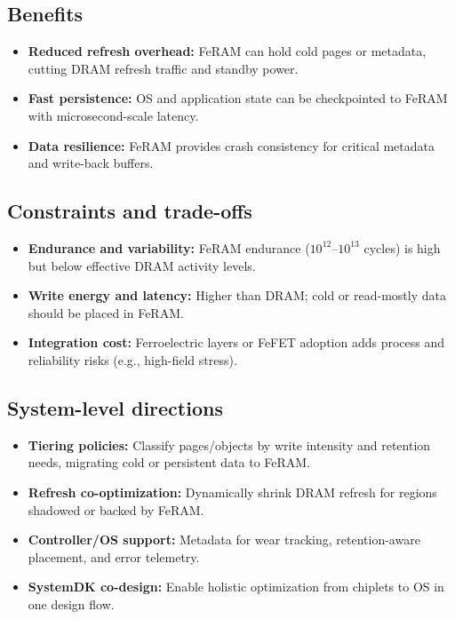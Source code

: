\subsection*{Benefits}
\begin{itemize}
  \item \textbf{Reduced refresh overhead:} FeRAM can hold cold pages or metadata, cutting DRAM refresh traffic and standby power.
  \item \textbf{Fast persistence:} OS and application state can be checkpointed to FeRAM with microsecond-scale latency.
  \item \textbf{Data resilience:} FeRAM provides crash consistency for critical metadata and write-back buffers.
\end{itemize}

\subsection*{Constraints and trade-offs}
\begin{itemize}
  \item \textbf{Endurance and variability:} FeRAM endurance ($10^{12}$--$10^{13}$ cycles) is high but below effective DRAM activity levels.
  \item \textbf{Write energy and latency:} Higher than DRAM; cold or read-mostly data should be placed in FeRAM.
  \item \textbf{Integration cost:} Ferroelectric layers or FeFET adoption adds process and reliability risks (e.g., high-field stress).
\end{itemize}

\subsection*{System-level directions}
\begin{itemize}
  \item \textbf{Tiering policies:} Classify pages/objects by write intensity and retention needs, migrating cold or persistent data to FeRAM.
  \item \textbf{Refresh co-optimization:} Dynamically shrink DRAM refresh for regions shadowed or backed by FeRAM.
  \item \textbf{Controller/OS support:} Metadata for wear tracking, retention-aware placement, and error telemetry.
  \item \textbf{SystemDK co-design:} Enable holistic optimization from chiplets to OS in one design flow.
\end{itemize}
